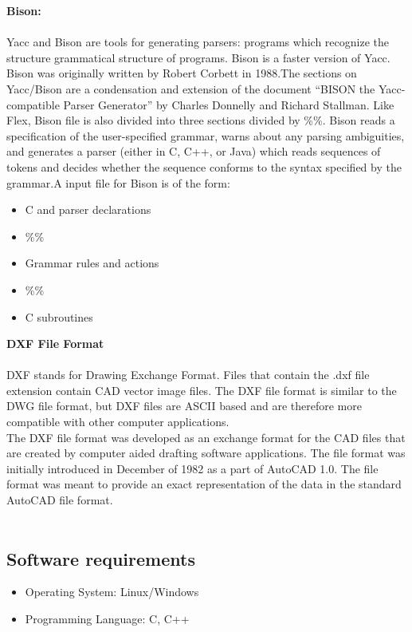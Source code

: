 \textbf{Bison:}\\\\
Yacc and Bison are tools for generating parsers: programs which recognize the structure grammatical structure of programs. Bison is a faster version of Yacc. Bison was originally written by Robert Corbett in 1988.The sections on Yacc/Bison are a condensation and extension of the document “BISON the Yacc-compatible Parser Generator” by Charles Donnelly and Richard Stallman. Like Flex, Bison file is also divided into three sections divided by \%\%. Bison reads a specification of the user-specified grammar, warns about any parsing ambiguities, and generates a parser (either in C, C++, or Java) which reads sequences of tokens and decides whether the sequence conforms to the syntax specified by the grammar.A input file for Bison is of the form:
\begin{itemize}
\item C and parser declarations
\item \%\%
\item Grammar rules and actions
\item \%\%
\item C subroutines
\end{itemize}
\textbf{DXF File Format}\\\\
DXF stands for Drawing Exchange Format. Files that contain the .dxf file extension contain CAD vector image files. The DXF file format is similar to the DWG file format, but DXF files are ASCII based and are therefore more compatible with other computer applications.\\
The DXF file format was developed as an exchange format for the CAD files that are created by computer aided drafting software applications. The file format was initially introduced in December of 1982 as a part of AutoCAD 1.0. The file format was meant to provide an exact representation of the data in the standard AutoCAD file format.\\\\

\subsection{Software requirements}
\begin{itemize}
\item Operating System: Linux/Windows
\item Programming Language: C, C++
\end{itemize}

